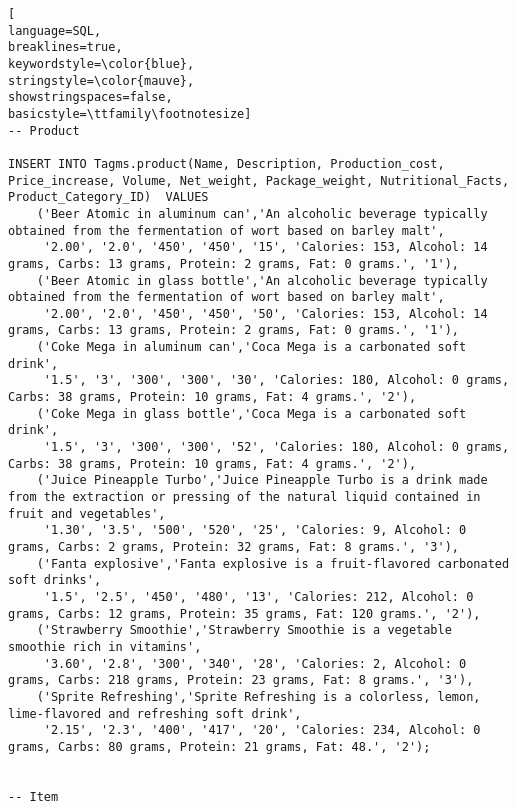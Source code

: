 \begin{lstlisting}[
language=SQL,
breaklines=true,
keywordstyle=\color{blue},
stringstyle=\color{mauve},
showstringspaces=false,
basicstyle=\ttfamily\footnotesize]
-- Product

INSERT INTO Tagms.product(Name, Description, Production_cost, Price_increase, Volume, Net_weight, Package_weight, Nutritional_Facts, Product_Category_ID)  VALUES
    ('Beer Atomic in aluminum can','An alcoholic beverage typically obtained from the fermentation of wort based on barley malt',
     '2.00', '2.0', '450', '450', '15', 'Calories: 153, Alcohol: 14 grams, Carbs: 13 grams, Protein: 2 grams, Fat: 0 grams.', '1'),
    ('Beer Atomic in glass bottle','An alcoholic beverage typically obtained from the fermentation of wort based on barley malt',
     '2.00', '2.0', '450', '450', '50', 'Calories: 153, Alcohol: 14 grams, Carbs: 13 grams, Protein: 2 grams, Fat: 0 grams.', '1'),
    ('Coke Mega in aluminum can','Coca Mega is a carbonated soft drink',
     '1.5', '3', '300', '300', '30', 'Calories: 180, Alcohol: 0 grams, Carbs: 38 grams, Protein: 10 grams, Fat: 4 grams.', '2'),
    ('Coke Mega in glass bottle','Coca Mega is a carbonated soft drink',
     '1.5', '3', '300', '300', '52', 'Calories: 180, Alcohol: 0 grams, Carbs: 38 grams, Protein: 10 grams, Fat: 4 grams.', '2'),
    ('Juice Pineapple Turbo','Juice Pineapple Turbo is a drink made from the extraction or pressing of the natural liquid contained in fruit and vegetables',
     '1.30', '3.5', '500', '520', '25', 'Calories: 9, Alcohol: 0 grams, Carbs: 2 grams, Protein: 32 grams, Fat: 8 grams.', '3'),
    ('Fanta explosive','Fanta explosive is a fruit-flavored carbonated soft drinks',
     '1.5', '2.5', '450', '480', '13', 'Calories: 212, Alcohol: 0 grams, Carbs: 12 grams, Protein: 35 grams, Fat: 120 grams.', '2'),
    ('Strawberry Smoothie','Strawberry Smoothie is a vegetable smoothie rich in vitamins',
     '3.60', '2.8', '300', '340', '28', 'Calories: 2, Alcohol: 0 grams, Carbs: 218 grams, Protein: 23 grams, Fat: 8 grams.', '3'),
    ('Sprite Refreshing','Sprite Refreshing is a colorless, lemon, lime-flavored and refreshing soft drink',
     '2.15', '2.3', '400', '417', '20', 'Calories: 234, Alcohol: 0 grams, Carbs: 80 grams, Protein: 21 grams, Fat: 48.', '2');


-- Item


\end{lstlisting}
